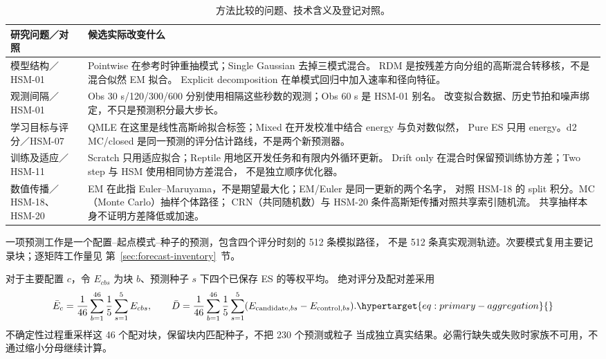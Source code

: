 \begin{table}[htbp]
\centering\footnotesize
\caption{方法比较的问题、技术含义及登记对照。}
\label{tab:method-reader}\hypertarget{tab:method-reader}{}
\begin{tabular}{@{}p{.22\linewidth}p{.69\linewidth}@{}}
\toprule
研究问题／对照 & 候选实际改变什么\\
\midrule
模型结构／HSM-01 &
Pointwise 在参考时钟重抽模式；Single Gaussian 去掉三模式混合。
RDM 是按残差方向分组的高斯混合转移核，不是混合似然 EM 拟合。
Explicit decomposition 在单模式回归中加入速率和径向特征。\\
观测间隔／HSM-01 &
Obs 30 s/120/300/600 分别使用相隔这些秒数的观测；Obs 60 s 是 HSM-01 别名。
改变拟合数据、历史节拍和噪声绑定，不只是预测积分最大步长。\\
学习目标与评分／HSM-07 &
QMLE 在这里是线性高斯岭拟合标签；Mixed 在开发校准中结合 energy 与负对数似然，
Pure ES 只用 energy。d2 MC/closed 是同一预测的评分估计路线，不是两个新预测器。\\
训练及适应／HSM-11 &
Scratch 只用适应拟合；Reptile 用地区开发任务和有限内外循环更新。
Drift only 在混合时保留预训练协方差；Two step 与 HSM 使用相同协方差混合，
不是独立顺序优化器。\\
数值传播／HSM-18、HSM-20 &
EM 在此指 Euler--Maruyama，不是期望最大化；EM/Euler 是同一更新的两个名字，
对照 HSM-18 的 split 积分。MC（Monte Carlo）抽样个体路径；
CRN（共同随机数）与 HSM-20 条件高斯矩传播对照共享索引随机流。
共享抽样本身不证明方差降低或加速。\\
\bottomrule
\end{tabular}
\end{table}

一项预测工作是一个配置--起点模式--种子的预测，包含四个评分时刻的 512 条模拟路径，
不是 512 条真实观测轨迹。次要模式复用主要记录块；逐矩阵工作量见
第~\ref{sec:forecast-inventory}~节。

对于主要配置 $c$，令 $E_{cbs}$ 为块 $b$、预测种子 $s$ 下四个已保存 ES 的等权平均。
绝对评分及配对差采用
\begin{equation}
\bar E_c=\frac{1}{46}\sum_{b=1}^{46}\frac{1}{5}\sum_{s=1}^{5}E_{cbs},
\qquad
\bar D=\frac{1}{46}\sum_{b=1}^{46}\frac{1}{5}\sum_{s=1}^{5}
(E_{\mathrm{candidate},bs}-E_{\mathrm{control},bs}).
\label{eq:primary-aggregation}\hypertarget{eq:primary-aggregation}{}
\end{equation}
不确定性过程重采样这 46 个配对块，保留块内匹配种子，不把 230 个预测或粒子
当成独立真实结果。必需行缺失或失败时家族不可用，不通过缩小分母继续计算。

